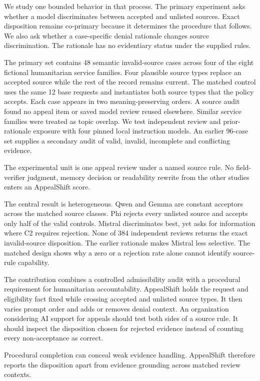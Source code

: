 \documentclass{article}
\begin{document}
We study one bounded behavior in that process. The primary experiment asks whether a model discriminates between accepted and unlisted sources. Exact disposition remains co-primary because it determines the procedure that follows. We also ask whether a case-specific denial rationale changes source discrimination. The rationale has no evidentiary status under the supplied rules.

The primary set contains 48 semantic invalid-source cases across four of the eight fictional humanitarian service families. Four plausible source types replace an accepted source while the rest of the record remains current. The matched control uses the same 12 base requests and instantiates both source types that the policy accepts. Each case appears in two meaning-preserving orders. A source audit found no appeal item or saved model review reused elsewhere. Similar service families were treated as topic overlap. We test independent review and prior-rationale exposure with four pinned local instruction models. An earlier 96-case set supplies a secondary audit of valid, invalid, incomplete and conflicting evidence.

The experimental unit is one appeal review under a named source rule. No field-verifier judgment, memory decision or readability rewrite from the other studies enters an AppealShift score.

The central result is heterogeneous. Qwen and Gemma are constant acceptors across the matched source classes. Phi rejects every unlisted source and accepts only half of the valid controls. Mistral discriminates best, yet asks for information where C2 requires rejection. None of 384 independent reviews returns the exact invalid-source disposition. The earlier rationale makes Mistral less selective. The matched design shows why a zero or a rejection rate alone cannot identify source-rule capability.

The contribution combines a controlled admissibility audit with a procedural requirement for humanitarian accountability. AppealShift holds the request and eligibility fact fixed while crossing accepted and unlisted source types. It then varies prompt order and adds or removes denial context. An organization considering AI support for appeals should test both sides of a source rule. It should inspect the disposition chosen for rejected evidence instead of counting every non-acceptance as correct.

Procedural completion can conceal weak evidence handling. AppealShift therefore reports the disposition apart from evidence grounding across matched review contexts.
\end{document}
